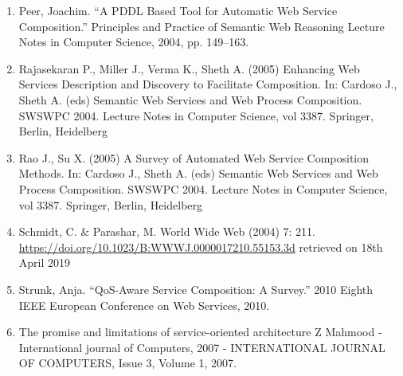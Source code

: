 \documentclass{article}
\begin{document}
\begin{enumerate}
\item Peer, Joachim. “A PDDL Based Tool for Automatic Web Service Composition.” Principles and Practice of Semantic Web Reasoning Lecture Notes in Computer Science, 2004, pp. 149–163.

\item Rajasekaran P., Miller J., Verma K., Sheth A. (2005) Enhancing Web Services Description and Discovery to Facilitate Composition. In: Cardoso J., Sheth A. (eds) Semantic Web Services and Web Process Composition. SWSWPC 2004. Lecture Notes in Computer Science, vol 3387. Springer, Berlin, Heidelberg

\item Rao J., Su X. (2005) A Survey of Automated Web Service Composition Methods. In: Cardoso J., Sheth A. (eds) Semantic Web Services and Web Process Composition. SWSWPC 2004. Lecture Notes in Computer Science, vol 3387. Springer, Berlin, Heidelberg

\item Schmidt, C. \& Parashar, M. World Wide Web (2004) 7: 211. \url{https://doi.org/10.1023/B:WWWJ.0000017210.55153.3d} retrieved on 18th April 2019

\item Strunk, Anja. “QoS-Aware Service Composition: A Survey.” 2010 Eighth IEEE European Conference on Web Services, 2010.

\item The promise and limitations of service-oriented architecture
Z Mahmood - International journal of Computers, 2007 - INTERNATIONAL JOURNAL OF COMPUTERS, Issue 3, Volume 1, 2007.

\end{enumerate}
\end{document}
